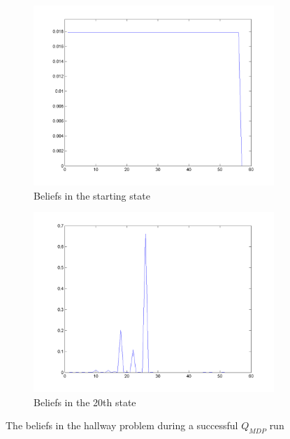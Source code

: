 \documentclass[10pt,a4paper]{article}
\begin{document}
\begin{figure}
        \centering
        \begin{subfigure}{0.48\textwidth}
        		\includegraphics[width=\textwidth]{Paths/hallway/plot-QMDP-bel-1-8045708648.png}
                \caption{Beliefs in the starting state}
                \label{fig:bel_qmdp_hallway_part1}
                \hspace{10pt}
        \end{subfigure}
        \quad
        \begin{subfigure}{0.48\textwidth}
        		\includegraphics[width=\textwidth]{Paths/hallway/plot-QMDP-bel-2-8045708648.png}
                \caption{Beliefs in the 20th state}
                \label{fig:bel_qmdp_hallway_part2}
                \hspace{-10pt}
        \end{subfigure}
        \caption{The beliefs in the hallway problem during a successful $Q_{MDP}$ run}
        \label{fig:bel_hallway_QMDP}
\end{figure}
\end{document}
